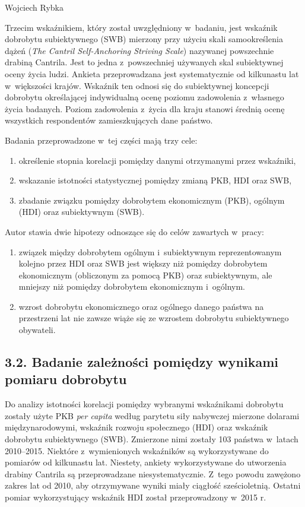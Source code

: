 \begin{artplenv}{Wojciech Rybka}

Trzecim wskaźnikiem, który został uwzględniony w~badaniu, jest wskaźnik dobrobytu subiektywnego (SWB) mierzony przy
użyciu skali samookreślenia dążeń (\textit{The Cantril Self-Anchoring Striving Scale}) nazywanej powszechnie drabiną
Cantrila. Jest to jedna z~powszechniej używanych skal subiektywnej oceny życia ludzi. Ankieta przeprowadzana jest
systematycznie od kilkunastu lat w~większości krajów. Wskaźnik ten odnosi się do subiektywnej koncepcji dobrobytu
określającej indywidualną ocenę poziomu zadowolenia z~własnego życia badanych. Poziom zadowolenia z~życia dla kraju
stanowi średnią ocenę wszystkich respondentów zamieszkujących dane państwo.

Badania przeprowadzone w~tej części mają trzy cele:

\begin{enumerate}
\item określenie stopnia korelacji pomiędzy danymi otrzymanymi przez wskaźniki,
\item wskazanie istotności statystycznej pomiędzy zmianą PKB, HDI oraz SWB,
\item zbadanie związku pomiędzy dobrobytem ekonomicznym (PKB), ogólnym (HDI) oraz subiektywnym (SWB).
\end{enumerate}
Autor stawia dwie hipotezy odnoszące się do celów zawartych w~pracy:

\begin{enumerate}
\item związek między dobrobytem ogólnym i~subiektywnym reprezentowanym kolejno przez HDI oraz SWB jest większy niż
pomiędzy dobrobytem ekonomicznym (obliczonym za pomocą PKB) oraz subiektywnym, ale mniejszy niż pomiędzy dobrobytem
ekonomicznym i~ogólnym.
\item wzrost dobrobytu ekonomicznego oraz ogólnego danego państwa na przestrzeni lat nie zawsze wiąże się ze wzrostem
dobrobytu subiektywnego obywateli.
\end{enumerate}
\subsection{3.2. Badanie zależności pomiędzy wynikami pomiaru dobrobytu}
Do analizy istotności korelacji pomiędzy wybranymi wskaźnikami dobrobytu zostały użyte PKB \textit{per capita} według parytetu
siły nabywczej mierzone dolarami międzynarodowymi, wskaźnik rozwoju społecznego (HDI) oraz wskaźnik dobrobytu
subiektywnego (SWB). Zmierzone nimi zostały 103 państwa w~latach 2010--2015. Niektóre z~wymienionych wskaźników są
wykorzystywane do pomiarów od kilkunastu lat. Niestety, ankiety wykorzystywane do utworzenia drabiny Cantrila są
przeprowadzane niesystematycznie. Z~tego powodu zawężono zakres lat od 2010, aby otrzymywane wyniki miały ciągłość
sześcioletnią. Ostatni pomiar wykorzystujący wskaźnik HDI został przeprowadzony w~2015 r. 


\end{artplenv}
